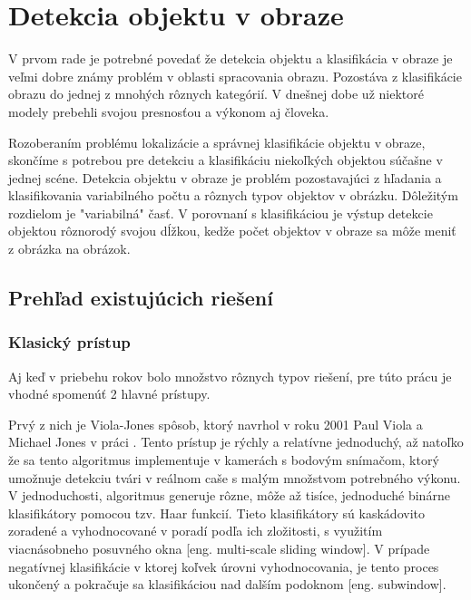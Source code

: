 
\section{Detekcia objektu v obraze}

V prvom rade je potrebné povedať že detekcia objektu a klasifikácia v obraze je veľmi dobre známy problém v oblasti spracovania obrazu.
Pozostáva z klasifikácie obrazu do jednej z mnohých rôznych kategórií.
V dnešnej dobe už niektoré modely prebehli svojou presnosťou a výkonom aj človeka\cite{prop:NNvsHuman}.

Rozoberaním problému lokalizácie a správnej klasifikácie objektu v obraze, skončíme s potrebou
    pre detekciu a klasifikáciu niekoľkých objektou súčašne v jednej scéne.
Detekcia objektu v obraze je problém pozostavajúci z hľadania a klasifikovania variabilného počtu a rôznych typov objektov v obrázku.
Dôležitým rozdielom je "variabilná" časť. V porovnaní s klasifikáciou je výstup detekcie objektou rôznorodý svojou dĺžkou, kedže
    počet objektov v obraze sa môže meniť z obrázka na obrázok\cite{odkaz:ObjectDetectionOverview}.

\subsection{Prehľad existujúcich riešení}

\subsubsection{Klasický prístup}
Aj keď v priebehu rokov bolo množstvo rôznych typov riešení, pre túto prácu je vhodné spomenúť 2 hlavné prístupy.

Prvý z nich je Viola-Jones spôsob, ktorý navrhol v roku 2001 Paul Viola a Michael Jones v práci \cite{prop:Viola2001RobustRF}.
Tento prístup je rýchly a relatívne jednoduchý, až natoľko že sa tento algoritmus implementuje v kamerách s bodovým snímačom, ktorý umožnuje
    detekciu tvári v reálnom caše s malým množstvom potrebného výkonu.
V jednoduchosti, algoritmus generuje rôzne, môže až tisíce, jednoduché binárne klasifikátory pomocou tzv. Haar funkcií.
Tieto klasifikátory sú kaskádovito zoradené a vyhodnocované v poradí podľa ich zložitosti, s využitím viacnásobneho posuvného okna [eng. multi-scale sliding window].
V prípade negatívnej klasifikácie v ktorej koľvek úrovni vyhodnocovania, je tento proces ukončený a pokračuje sa klasifikáciou nad dalším podoknom [eng. subwindow]\cite{prop:Viola2001RobustRF}.

